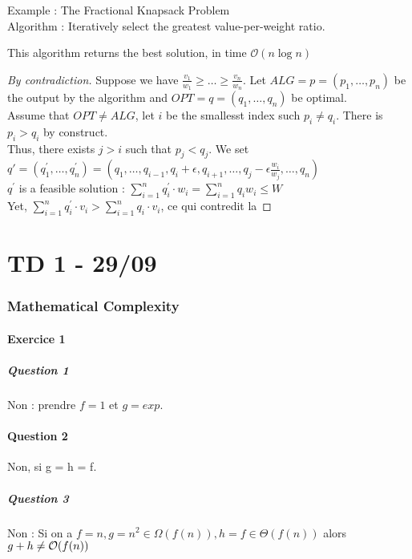 \documentclass{cours}
\begin{document}
Example : The Fractional Knapsack Problem\\
Algorithm : Iteratively select the greatest value-per-weight ratio. \\
\begin{theorem}
    This algorithm returns the best solution, in time $\mathcal{O}(n \log n)$
\end{theorem}
\begin{proof}[By contradiction]
    Suppose we have $\frac{v_{1}}{w_{1}} \geq \ldots \geq \frac{v_{n}}{w_{n}}$. Let $ALG = p = (p_{1}, \ldots, p_{n})$ be the output by the algorithm and $OPT = q = (q_{1}, \ldots, q_{n})$ be optimal.\\
    Assume that $OPT \neq ALG$, let $i$ be the smallesst index such $p_{i} \neq q_{i}$. There is $p_{i} > q_{i}$ by construct. \\
    Thus, there exists $j > i$ such that $p_{j} < q_{j}$. We set $q' = (q_{1}^{'}, \ldots, q_{n}^{'}) = (q_{1}, \ldots, q_{i-1}, q_{i} + \epsilon, q_{i+1}, \ldots, q_{j} - \epsilon\frac{w_{i}}{w_{j}}, \ldots, q_{n})$\\
    $q^{'}$ is a feasible solution : $\sum\limits_{i = 1}^{n} q_{i}^{'} \cdot w_{i} = \sum\limits_{i = 1}^{n} q_{i} w_{i} \leq W$\\
    Yet, $\sum\limits_{i = 1}^{n} q_{i}^{'} \cdot v_{i} > \sum\limits_{i = 1}^{n} q_{i} \cdot v_{i}$, ce qui contredit la 
\end{proof}

\part{TD 1 - 29/09}
\localtableofcontents
\section{Mathematical Complexity}
\subsection{Exercice 1}
\subsubsection{Question 1}
Non : prendre $f = 1$ et $g = exp$.
\subsection{Question 2}
Non, si g = h = f.
\subsubsection{Question 3}
Non : Si on a $f = n, g = n^{2} \in \Omega(f(n)), h = f \in \Theta(f(n))$ alors $g + h \neq \mathcal{O}(f(n))$
\end{document}

